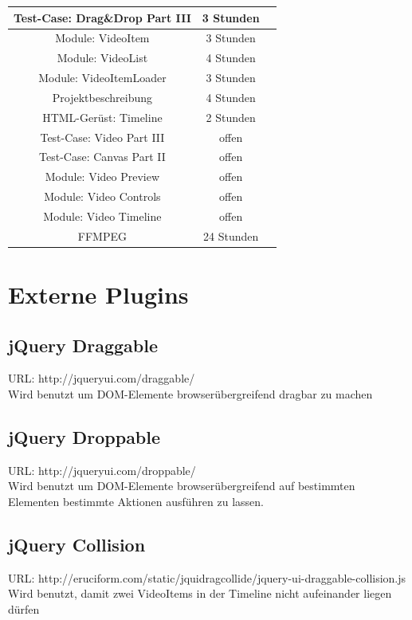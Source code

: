 \documentclass[a4paper,10pt]{scrartcl}
\begin{document}
\begin{tabular}{|c|c|c|}
	Test-Case: Drag\&Drop Part III & 3 Stunden \\ \hline
	
	Module: VideoItem & 3 Stunden \\ \hline
	
	Module: VideoList & 4 Stunden \\ \hline
			
	Module: VideoItemLoader & 3 Stunden \\ \hline
		
	Projektbeschreibung & 4 Stunden \\ \hline
	
	HTML-Gerüst: Timeline & 2 Stunden \\ \hline
	
	Test-Case: Video Part III & offen \\ \hline
	
	Test-Case: Canvas Part II & offen \\ \hline
	
	Module: Video Preview & offen \\ \hline
	
	Module: Video Controls & offen \\ \hline
	
	Module: Video Timeline & offen \\ \hline
	
	FFMPEG & 24 Stunden \\ \hline
 \end{tabular}
 \newpage
\section{Externe Plugins}
\subsection{jQuery Draggable}
URL: http://jqueryui.com/draggable/\\
Wird benutzt um DOM-Elemente browserübergreifend dragbar zu machen
\subsection{jQuery Droppable}
URL: http://jqueryui.com/droppable/\\
Wird benutzt um DOM-Elemente browserübergreifend auf bestimmten Elementen bestimmte Aktionen ausführen zu lassen.
\subsection{jQuery Collision}
URL: http://eruciform.com/static/jquidragcollide/jquery-ui-draggable-collision.js\\
Wird benutzt, damit zwei VideoItems in der Timeline nicht aufeinander liegen dürfen
\end{document}
